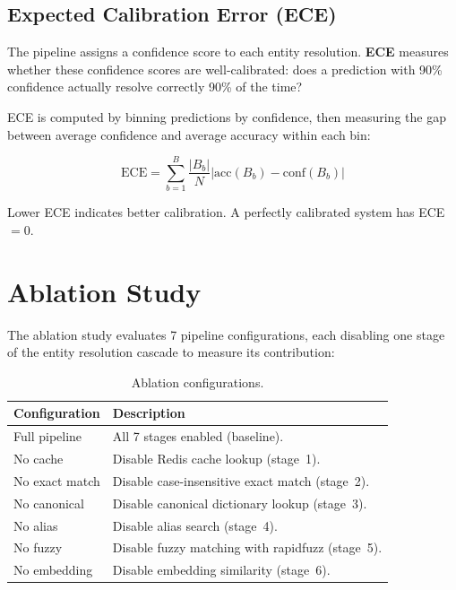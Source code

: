 \subsection{Expected Calibration Error (ECE)}

The pipeline assigns a confidence score to each entity resolution.
\textbf{ECE} measures whether these confidence scores are well-calibrated:
does a prediction with 90\% confidence actually resolve correctly 90\% of
the time?

ECE is computed by binning predictions by confidence, then measuring the
gap between average confidence and average accuracy within each bin:

\[
    \text{ECE} = \sum_{b=1}^{B} \frac{|B_b|}{N}
    \left| \text{acc}(B_b) - \text{conf}(B_b) \right|
\]

Lower ECE indicates better calibration.  A perfectly calibrated system
has ECE~$= 0$.


\section{Ablation Study}
\label{sec:eval-ablation}

The ablation study evaluates 7 pipeline configurations, each disabling
one stage of the entity resolution cascade to measure its contribution:

\begin{table}[ht]
\centering
\caption{Ablation configurations.}
\label{tab:ablation}
\begin{tabularx}{\textwidth}{l X}
\toprule
\textbf{Configuration} & \textbf{Description} \\
\midrule
Full pipeline         & All 7 stages enabled (baseline). \\
No cache              & Disable Redis cache lookup (stage~1). \\
No exact match        & Disable case-insensitive exact match (stage~2). \\
No canonical          & Disable canonical dictionary lookup (stage~3). \\
No alias              & Disable alias search (stage~4). \\
No fuzzy              & Disable fuzzy matching with rapidfuzz (stage~5). \\
No embedding          & Disable embedding similarity (stage~6). \\
\bottomrule
\end{tabularx}
\end{table}

